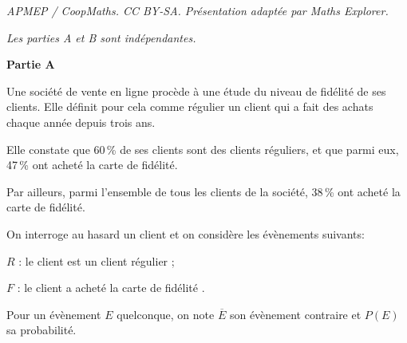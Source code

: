 \documentclass[10pt]{article}
\begin{document}
\noindent\textit{APMEP / CoopMaths. CC BY-SA. Présentation adaptée par Maths Explorer.}\par\medskip
\medskip

\emph{Les parties {\rm A} et {\rm B} sont indépendantes.}

\medskip

\textbf{Partie A}

\medskip

Une société de vente en ligne procède à une étude du niveau de fidélité de ses clients. Elle définit pour cela comme \og régulier\fg{} un client qui a fait des achats chaque année depuis trois ans.

Elle constate que 60\,\% de ses clients sont des clients réguliers, et que parmi eux, 47\,\% ont acheté la carte de fidélité.

Par ailleurs, parmi l'ensemble de tous les clients de la société, 38\,\% ont acheté la carte de fidélité.

\begin{list}{\textbullet}{On interroge au hasard un client et on considère les évènements suivants:}
\item $R$ : \og le client est un client régulier\fg{} ;
\item $F$ : \og le client a acheté la carte de fidélité \fg.
\end{list}



Pour un évènement $E$ quelconque, on note $\overline{E}$ son évènement contraire et $P(E)$ sa probabilité.

\medskip
\end{document}
